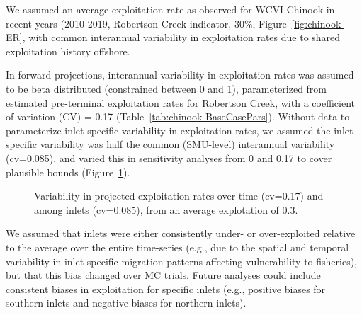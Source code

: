 \documentclass[11pt]{book}
\begin{document}
We assumed an average exploitation rate as observed for WCVI Chinook in recent years (2010-2019, Robertson Creek indicator, 30\%, Figure~\ref{fig:chinook-ER}, with common interannual variability in exploitation rates due to shared exploitation history offshore.

In forward projections, interannual variability in exploitation rates was assumed to be beta distributed (constrained between 0 and 1), parameterized from estimated pre-terminal exploitation rates for Robertson Creek, with a coefficient of variation (CV) = 0.17 (Table~\ref{tab:chinook-BaseCasePars}). Without data to parameterize inlet-specific variability in exploitation rates, we assumed the inlet-specific variability was half the common (SMU-level) interannual variability (cv=0.085), and varied this in sensitivity analyses from 0 and 0.17 to cover plausible bounds (Figure~\ref{fig:chinook-ERdist}).
\begin{figure}[htb]

{\centering {} 

}

\caption{Variability in projected exploitation rates over time (cv=0.17) and among inlets (cv=0.085), from an average explotation of 0.3.}\label{fig:chinook-ERdist}
\end{figure}
We assumed that inlets were either consistently under- or over-exploited relative to the average over the entire time-series (e.g., due to the spatial and temporal variability in inlet-specific migration patterns affecting vulnerability to fisheries), but that this bias changed over MC trials. Future analyses could include consistent biases in exploitation for specific inlets (e.g., positive biases for southern inlets and negative biases for northern inlets).
\end{document}

